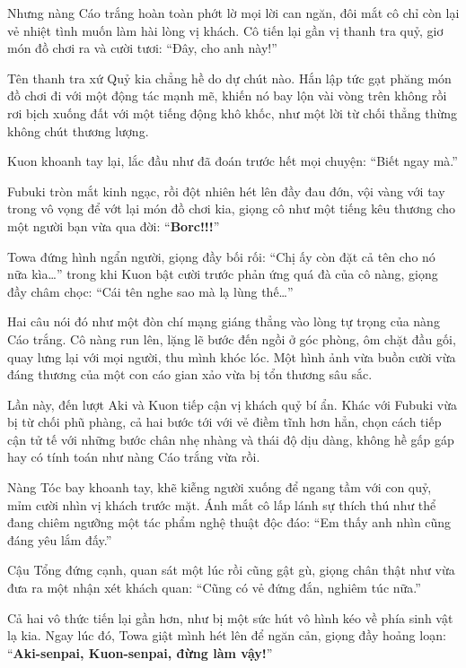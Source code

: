 \documentclass[../main.tex]{subfiles}
\begin{document}
Nhưng nàng Cáo trắng hoàn toàn phớt lờ mọi lời can ngăn, đôi mắt cô chỉ còn lại vẻ nhiệt tình muốn làm hài lòng vị khách. Cô tiến lại gần vị thanh tra quỷ, giơ món đồ chơi ra và cười tươi: ``Đây, cho anh này!''

Tên thanh tra xứ Quỷ kia chẳng hề do dự chút nào. Hắn lập tức gạt phăng món đồ chơi đi với một động tác mạnh mẽ, khiến nó bay lộn vài vòng trên không rồi rơi bịch xuống đất với một tiếng động khô khốc, như một lời từ chối thẳng thừng không chút thương lượng.

Kuon khoanh tay lại, lắc đầu như đã đoán trước hết mọi chuyện: ``Biết ngay mà.''

Fubuki tròn mắt kinh ngạc, rồi đột nhiên hét lên đầy đau đớn, vội vàng với tay trong vô vọng để vớt lại món đồ chơi kia, giọng cô như một tiếng kêu thương cho một người bạn vừa qua đời: ``\textbf{Borc!!!}''


Towa đứng hình ngẩn người, giọng đầy bối rối: ``Chị ấy còn đặt cả tên cho nó nữa kìa\dots'' trong khi Kuon bật cười trước phản ứng quá đà của cô nàng, giọng đầy châm chọc: ``Cái tên nghe sao mà lạ lùng thế\dots''

Hai câu nói đó như một đòn chí mạng giáng thẳng vào lòng tự trọng của nàng Cáo trắng. Cô nàng run lên, lặng lẽ bước đến ngồi ở góc phòng, ôm chặt đầu gối, quay lưng lại với mọi người, thu mình khóc lóc. Một hình ảnh vừa buồn cười vừa đáng thương của một con cáo gian xảo vừa bị tổn thương sâu sắc.


Lần này, đến lượt Aki và Kuon tiếp cận vị khách quỷ bí ẩn. Khác với Fubuki vừa bị từ chối phũ phàng, cả hai bước tới với vẻ điềm tĩnh hơn hẳn, chọn cách tiếp cận tử tế với những bước chân nhẹ nhàng và thái độ dịu dàng, không hề gấp gáp hay có tính toán như nàng Cáo trắng vừa rồi.

Nàng Tóc bay khoanh tay, khẽ kiễng người xuống để ngang tầm với con quỷ, mỉm cười nhìn vị khách trước mặt. Ánh mắt cô lấp lánh sự thích thú như thể đang chiêm ngưỡng một tác phẩm nghệ thuật độc đáo: ``Em thấy anh nhìn cũng đáng yêu lắm đấy.''

Cậu Tổng đứng cạnh, quan sát một lúc rồi cũng gật gù, giọng chân thật như vừa đưa ra một nhận xét khách quan: ``Cũng có vẻ đứng đắn, nghiêm túc nữa.''

Cả hai vô thức tiến lại gần hơn, như bị một sức hút vô hình kéo về phía sinh vật lạ kia. Ngay lúc đó, Towa giật mình hét lên để ngăn cản, giọng đầy hoảng loạn: ``\textbf{Aki-senpai, Kuon-senpai, đừng làm vậy!}''
\end{document}
